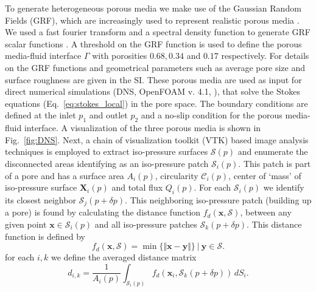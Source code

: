 \documentclass[draft]{agujournal2019}
\begin{document}
To generate heterogeneous porous media we make use of the Gaussian Random Fields (GRF), which are increasingly used to represent realistic porous media \cite{liu_advances_2019}. We used a fast fourier transform and a spectral density function to generate GRF scalar functions \cite{teubner_level_1991,hyman_heterogeneities_2012,siena_relationship_2014}. A threshold on the GRF function is used to define the porous media-fluid interface $\Gamma$ with porosities $0.68, 0.34$ and $0.17$ respectively. For details on the GRF functions and geometrical parameters such as average pore size and surface roughness are given in the SI. These porous media are used as input for direct numerical simulations (DNS, OpenFOAM v. 4.1, ), that solve the Stokes equations (Eq.~\ref{eq:stokes_local}) in the pore space. The boundary conditions are defined at the inlet $p_1$ and outlet $p_2$ and a no-slip condition for the porous media-fluid interface. A visualization of the three porous media is shown in Fig.~\ref{fig:DNS}. Next, a chain of visualization toolkit (VTK) based image analysis techniques \cite{schroeder_visualization_2006,hernderson_paraview_2007} is employed to extract iso-pressure surfaces $\mathcal{S}(p)$ and enumerate the disconnected areas identifying as an iso-pressure patch $\mathcal{S}_i(p)$. This patch is part of a pore and has a surface area $A_i(p)$, circularity $\mathcal{C}_i(p)$, center of `mass' of iso-pressure surface $\mathbf{X}_i(p)$ and total flux $Q_i(p)$. For each $\mathcal{S}_i(p)$ we identify its closest neighbor $\mathcal{S}_j(p+\delta p)$. This neighboring iso-pressure patch (building up a pore) is found by calculating the distance function $f_d(\mathbf{x},\mathcal{S})$, between any given point $\mathbf{x}\in \mathcal{S}_i(p)$ and all iso-pressure patches $\mathcal{S}_k(p+\delta p)$. This distance function is defined by
\begin{equation}
	f_d\left(\mathbf{x},\mathcal{S}\right) = \min \{\Vert\mathbf{x}-\mathbf{y}\Vert \} ~|~ \mathbf{y}\in \mathcal{S}.
\end{equation}
for each $i,k$ we define the averaged distance matrix 
\begin{equation}
	d_{i,k} = \frac{1}{A_i(p)}\int_{\mathcal{S}_i(p)} f_d(\mathbf{x}_i,\mathcal{S}_k(p+\delta p)) \,dS_i.
\end{equation}
\end{document}

